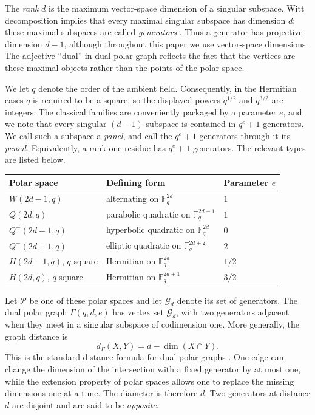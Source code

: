 \documentclass[11pt]{article}
\theoremstyle{definition}
\theoremstyle{remark}
\newcommand{\F}{\mathbb F}
\begin{document}
The \emph{rank} $d$ is the maximum vector-space dimension of a singular
subspace.  Witt decomposition implies that every maximal singular subspace
has dimension $d$; these maximal subspaces are called \emph{generators}
\cite{TaylorClassicalGroups}.
Thus a generator has projective dimension $d-1$, although throughout this
paper we use vector-space dimensions.  The adjective ``dual'' in dual 
polar
graph reflects the fact that the vertices are these maximal objects rather
than the points of the polar space.

We let $q$ denote the order of the ambient field.  Consequently, in the
Hermitian cases $q$ is required to be a square, so the displayed powers
$q^{1/2}$ and $q^{3/2}$ are integers.  The classical families are 
conveniently packaged by a parameter $e$, and we note that every singular 
$(d-1)$-subspace is contained in $q^e+1$ generators.  We call such a 
subspace a \emph{panel}, and call the $q^e+1$ generators through it its 
\emph{pencil}.  Equivalently, a rank-one residue has $q^e+1$ generators.  
The relevant types are listed below.

\begin{center}
\begin{tabular}{lll}
\toprule
Polar space & Defining form & Parameter $e$ \\
\midrule
$W(2d-1,q)$ & alternating on $\F_q^{2d}$ & $1$ \\
$Q(2d,q)$ & parabolic quadratic on $\F_q^{2d+1}$ & $1$ \\
$Q^+(2d-1,q)$ & hyperbolic quadratic on $\F_q^{2d}$ & $0$ \\
$Q^-(2d+1,q)$ & elliptic quadratic on $\F_q^{2d+2}$ & $2$ \\
$H(2d-1,q)$, $q$ square & Hermitian on $\F_q^{2d}$ & $1/2$ \\
$H(2d,q)$, $q$ square & Hermitian on $\F_q^{2d+1}$ & $3/2$ \\
\bottomrule
\end{tabular}
\end{center}

Let $\mathcal P$ be one of these polar spaces and let $\mathcal G_d$ 
denote
its set of generators.  The dual polar graph $\Gamma(q,d,e)$ has vertex 
set
$\mathcal G_d$, with two generators adjacent when they meet in a singular
subspace of codimension one.  More generally, the graph distance is
\begin{equation}\label{eq:dual-distance}
        d_\Gamma(X,Y)=d-\dim(X\cap Y).
\end{equation}
This is the standard distance formula for dual polar graphs
\cite[Sec.~9.4.1]{BCN}.  One edge can change the dimension of the
intersection with a fixed generator by at most one, while the extension
property of polar spaces allows one to replace the missing dimensions one
at a time.  The diameter is
therefore $d$.  Two generators at distance $d$ are disjoint and are said 
to
be \emph{opposite}.
\end{document}
